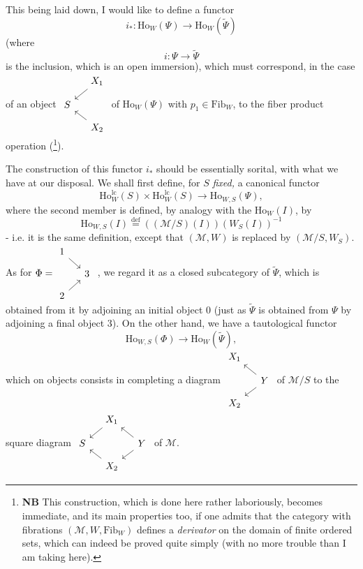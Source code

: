 \documentclass[11pt]{article}
\newcommand{\printedpage}[1]{\marginpar{\footnotesize p.~#1}}
\newcommand{\msp}[1]{\marginpar{\footnotesize [#1]}}
\newcommand{\Ho}{\mathrm{Ho}}
\newcommand{\lc}{\mathrm{lc}}
\begin{document}
This being laid down, I would like to define a functor
\[
i_* : \Ho_W(\Psi) \longrightarrow \Ho_W(\tilde{\Psi})
\]
(where
\[
i : \Psi \longrightarrow \tilde{\Psi}
\]
is the inclusion, which is an open immersion), which must correspond, in the case of an object $\vcenter{\hbox{\begin{tikzcd}[ampersand replacement=\&, row sep=small, column sep=small]
 \& X_1 \arrow[dl] \\
S \& \\
 \& X_2 \arrow[ul]
\end{tikzcd}}}$ of $\Ho_W(\Psi)$ with $p_1 \in \mathrm{Fib}_W$, to the fiber product operation (\footnote[131]{\textbf{NB} This construction, which is done here rather laboriously, becomes immediate, and its main properties too, if one admits that the category with fibrations $(\mathcal{M}, W, \mathrm{Fib}_W)$ defines a \textit{derivator} on the domain of finite ordered sets, which can indeed be proved quite simply (with no more trouble than I am taking here).}).

\printedpage{158}

\msp{page 244}
The construction of this functor $i_*$ should be essentially sorital, with what we have at our disposal. We shall first define, for $S$ \textit{fixed,} a canonical functor
\[
\Ho^{\lc}_W(S) \times \Ho^{\lc}_W(S) \longrightarrow \Ho_{W,S}(\Psi), \tag*{$(*)$}
\]
where the second member is defined, by analogy with the $\Ho_W(I)$, by
\[
\Ho_{W,S}(I) \overset{\text{def}}{=} ((\mathcal{M}/S)(I))(W_S(I))^{-1}
\]
- i.e. it is the same definition, except that $(\mathcal{M}, W)$ is replaced by $(\mathcal{M}/S, W_S)$. As for $\Phi = \vcenter{\hbox{\begin{tikzcd}[ampersand replacement=\&, row sep=small, column sep=small]
1 \arrow[dr] \& \\
 \& 3 \\
2 \arrow[ur] \&
\end{tikzcd}}}$ , we regard it as a closed subcategory of $\tilde{\Psi}$, which is obtained from it by adjoining an initial object 0 (just as $\tilde{\Psi}$ is obtained from $\Psi$ by adjoining a final object 3). On the other hand, we have a tautological functor
\[
\Ho_{W,S}(\Phi) \longrightarrow \Ho_W(\tilde{\Psi}), \tag*{$(*')$}
\]
which on objects consists in completing a diagram $\vcenter{\hbox{\begin{tikzcd}[ampersand replacement=\&, row sep=small, column sep=small] %
X_1 \& \\
 \& Y \arrow[ul] \arrow[dl] \\
X_2 \&
\end{tikzcd}}}$ of $\mathcal{M}/S$ to the square diagram $\vcenter{\hbox{\begin{tikzcd}[ampersand replacement=\&, row sep=small, column sep=small]
 \& X_1 \arrow[dl] \& \\
S \& \& Y \arrow[ul] \arrow[dl] \\
 \& X_2 \arrow[ul] \&
\end{tikzcd}}}$ of $\mathcal{M}$.
\end{document}
